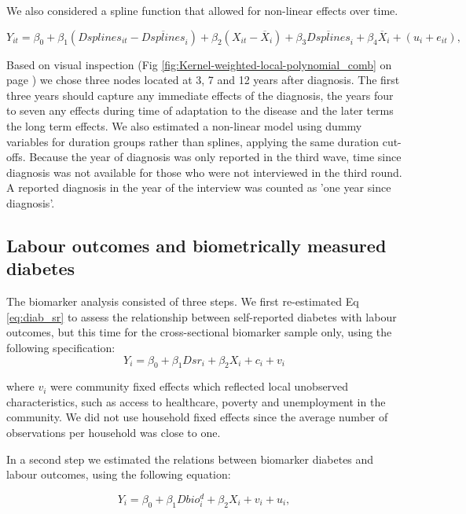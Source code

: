 \documentclass[10pt,letterpaper]{article}
\begin{document}
We also considered a spline function that allowed for non-linear effects over time.

\begin{equation}
Y_{it}=\beta_{0}+\beta_{1}(Dsplines_{it}-\overline{Dsplines}_{i})+\beta_{2}(X_{it}-\overline{X}_i)+\beta_{3}\overline{Dsplines}_{i}+\beta_{4}\overline{X}_i+(u_{i}+e_{it}),\label{eq:splines}
\end{equation}

Based on visual inspection (Fig \ref{fig:Kernel-weighted-local-polynomial_comb} on page \pageref{fig:Kernel-weighted-local-polynomial_comb}) we chose three nodes located at 3, 7 and 12 years after diagnosis. The first three years should capture any immediate effects of the diagnosis, the years four to seven any effects during time of adaptation to the disease and the later terms the long term effects. We also estimated a non-linear model using dummy variables for duration groups rather than splines, applying the same duration cut-offs. Because the year of diagnosis was only reported in the third wave, time since diagnosis was not available for those who were not interviewed in the third round.  A reported diagnosis in the year of the interview was counted as 'one year since diagnosis'.

\subsection*{\label{sec:Biomarker Strategy}Labour outcomes and biometrically measured diabetes}

The biomarker analysis consisted of three steps. We first re-estimated Eq \ref{eq:diab_sr} to assess the relationship between self-reported diabetes with labour outcomes, but this time for the cross-sectional biomarker sample only, using the following specification:
\begin{equation}
Y_{i}=\beta_{0}+\beta_{1}Dsr_{i}+\beta_{2}X_{i}+c_{i}+v_{i}\label{eq:diab_sr}
\end{equation}

where $v_{i}$ were community fixed effects which reflected local unobserved characteristics, such as access to healthcare, poverty and unemployment in the community. We did not use household fixed effects since the average number of observations per household was close to one.

In a second step we estimated the relations between biomarker diabetes and labour outcomes, using the following equation:

\begin{equation}
Y_{i}=\beta_{0}+\beta_{1}Dbio^{d}_{i}+\beta_{2}X_{i}+v_{i}+u_{i}\label{eq:diab},
\end{equation}
\end{document}
